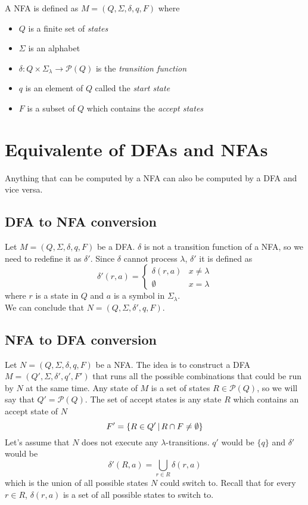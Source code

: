 \documentclass{article}
\newcommand{\emptyString}{\lambda}
\begin{document}
A NFA is defined as \(M=(Q, \Sigma, \delta, q, F)\) where
\begin{itemize}
    \item \(Q\) is a finite set of \textit{states}
    \item \(\Sigma\) is an alphabet
    \item \(\delta : Q \times \Sigma_\emptyString \to \mathcal{P}(Q)\) is the \textit{transition function}
    \item \(q\) is an element of \(Q\) called the \textit{start state}
    \item \(F\) is a subset of \(Q\) which contains the \textit{accept states}
\end{itemize}

\section{Equivalente of DFAs and NFAs}

Anything that can be computed by a NFA can also be computed by a DFA and vice versa.

\subsection{DFA to NFA conversion}

Let \(M=(Q, \Sigma, \delta, q, F)\) be a DFA.
\(\delta\) is not a transition function of a NFA, so we need to redefine it as \(\delta'\).
Since \(\delta\) cannot process \(\emptyString\), \(\delta'\)
it is defined as
\[
    \delta'(r, a)=
    \begin{cases} 
        \delta(r, a) & x \neq \emptyString \\
        \emptyset & x = \emptyString
    \end{cases}
\]
where \(r\) is a state in \(Q\) and \(a\) is a symbol in \(\Sigma_\emptyString\). \\
We can conclude that \(N=(Q, \Sigma, \delta', q, F)\).

\subsection{NFA to DFA conversion}

Let \(N=(Q, \Sigma, \delta, q, F)\) be a NFA. The idea is to construct a DFA \(M=(Q', \Sigma, \delta', q', F')\)
that runs all the possible combinations that could be run by \(N\) at the same time.
Any state of \(M\) is a set of states \(R \in \mathcal{P}(Q)\), so we will say that
\(Q'=\mathcal{P}(Q)\). The set of accept states is any state \(R\) which contains an accept
state of \(N\)
\[
    F' = \{R \in Q' \,|\, R \cap F \neq \emptyset\}
\]
Let's assume that \(N\) does not execute any \(\emptyString\)-transitions.
\(q'\) would be \(\{q\}\) and \(\delta'\) would be
\[
    \delta'(R, a) = \bigcup_{r\in R}\delta(r,a)
\]
which is the union of all possible states \(N\) could switch to.
Recall that for every \(r\in R\), \(\delta(r,a)\) is a set
of all possible states to switch to.
\end{document}
